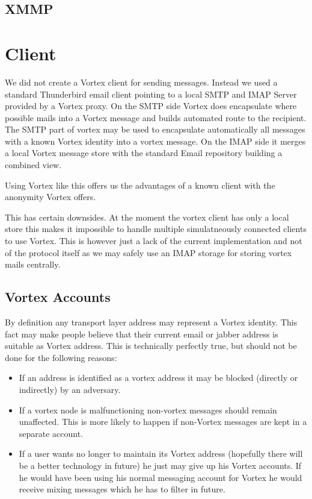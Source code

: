 \subsection{XMMP}

\section{Client}
We did not create a Vortex client for sending messages. Instead we used a standard Thunderbird email client pointing to a local SMTP and IMAP Server provided by a Vortex proxy. On the SMTP side Vortex does encapsulate where possible mails into a Vortex message and builds automated route to the recipient. The SMTP part of vortex may be used to encapsulate automatically all messages with a known Vortex identity into a vortex message. On the IMAP side it merges a local Vortex message store with the standard Email repository building a combined view.

Using Vortex like this offers us the advantages of a known client with the anonymity Vortex offers.

This has certain downsides. At the moment the vortex client has only a local store this makes it impossible to handle multiple simulatneously connected clients to use Vortex. This is however just a lack of the current implementation and not of the protocol itself as we may safely use an IMAP storage for storing vortex mails centrally.

\subsection{Vortex Accounts}
By definition any transport layer address may represent a Vortex identity. This fact may make people believe that their current email or jabber address is suitable as Vortex address. This is technically perfectly true, but should not be done for the following reasons:

\begin{itemize}
	\item If an address is identified as a vortex address it may be blocked (directly or indirectly) by an adversary.
	\item If a vortex node is malfunctioning non-vortex messages should remain unaffected. This is more likely to happen if non-Vortex messages are kept in a separate account.
	\item If a user wants no longer to maintain its Vortex address (hopefully there will be a better technology in future) he just may give up his Vortex accounts. If he would have been using his normal messaging account for Vortex he would receive mixing messages which he has to filter in future.
\end{itemize}

